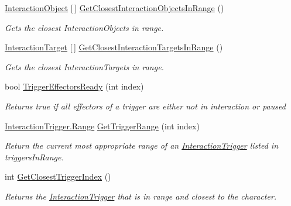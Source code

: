 \begin{DoxyCompactItemize}
\mbox{\hyperlink{class_root_motion_1_1_final_i_k_1_1_interaction_object}{Interaction\+Object}} \mbox{[}$\,$\mbox{]} \mbox{\hyperlink{class_root_motion_1_1_final_i_k_1_1_interaction_system_aae5e55baec3a01214a8b4788c65e0dfd}{Get\+Closest\+Interaction\+Objects\+In\+Range}} ()
\begin{DoxyCompactList}\small\item\em Gets the closest Interaction\+Objects in range. \end{DoxyCompactList}\item 
\mbox{\hyperlink{class_root_motion_1_1_final_i_k_1_1_interaction_target}{Interaction\+Target}} \mbox{[}$\,$\mbox{]} \mbox{\hyperlink{class_root_motion_1_1_final_i_k_1_1_interaction_system_a43ffee1b7612900f277f9ceed7e4fbc1}{Get\+Closest\+Interaction\+Targets\+In\+Range}} ()
\begin{DoxyCompactList}\small\item\em Gets the closest Interaction\+Targets in range. \end{DoxyCompactList}\item 
bool \mbox{\hyperlink{class_root_motion_1_1_final_i_k_1_1_interaction_system_a0f01fb429433d58907497e1202faf52b}{Trigger\+Effectors\+Ready}} (int index)
\begin{DoxyCompactList}\small\item\em Returns true if all effectors of a trigger are either not in interaction or paused \end{DoxyCompactList}\item 
\mbox{\hyperlink{class_root_motion_1_1_final_i_k_1_1_interaction_trigger_1_1_range}{Interaction\+Trigger.\+Range}} \mbox{\hyperlink{class_root_motion_1_1_final_i_k_1_1_interaction_system_a33b3ea9f645971b42ea6bc87e97c1f8e}{Get\+Trigger\+Range}} (int index)
\begin{DoxyCompactList}\small\item\em Return the current most appropriate range of an \mbox{\hyperlink{class_root_motion_1_1_final_i_k_1_1_interaction_trigger}{Interaction\+Trigger}} listed in triggers\+In\+Range. \end{DoxyCompactList}\item 
int \mbox{\hyperlink{class_root_motion_1_1_final_i_k_1_1_interaction_system_a81d9ef8e0ca4a4348eae92acc5269983}{Get\+Closest\+Trigger\+Index}} ()
\begin{DoxyCompactList}\small\item\em Returns the \mbox{\hyperlink{class_root_motion_1_1_final_i_k_1_1_interaction_trigger}{Interaction\+Trigger}} that is in range and closest to the character. \end{DoxyCompactList}\item 

\end{DoxyCompactItemize}
